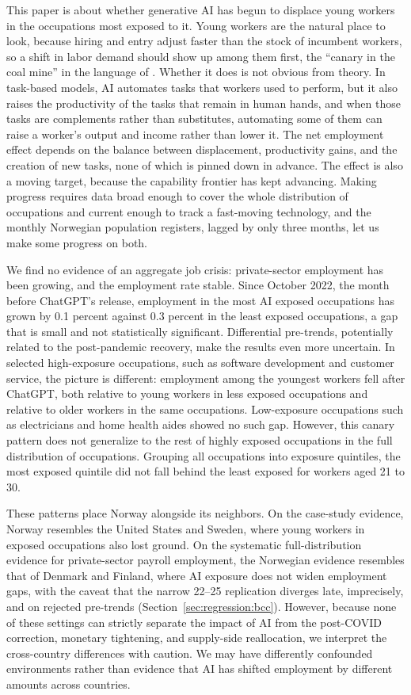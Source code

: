 \documentclass[12pt]{article}
\begin{document}
This paper is about whether generative AI has begun to displace young workers in the occupations most exposed to it. Young workers are the natural place to look, because hiring and entry adjust faster than the stock of incumbent workers, so a shift in labor demand should show up among them first, the ``canary in the coal mine'' in the language of \citet{brynjolfsson2025}. Whether it does is not obvious from theory. In task-based models, AI automates tasks that workers used to perform, but it also raises the productivity of the tasks that remain in human hands, and when those tasks are complements rather than substitutes, automating some of them can raise a worker's output and income rather than lower it. The net employment effect depends on the balance between displacement, productivity gains, and the creation of new tasks, none of which is pinned down in advance. The effect is also a moving target, because the capability frontier has kept advancing. Making progress requires data broad enough to cover the whole distribution of occupations and current enough to track a fast-moving technology, and the monthly Norwegian population registers, lagged by only three months, let us make some progress on both.

We find no evidence of an aggregate job crisis: private-sector employment has been growing, and the employment rate stable. Since October 2022, the month before ChatGPT's release, employment in the most AI exposed occupations has grown by 0.1 percent against 0.3 percent in the least exposed occupations, a gap that is small and not statistically significant. Differential pre-trends, potentially related to the post-pandemic recovery, make the results even more uncertain. In selected high-exposure occupations, such as software development and customer service, the picture is different: employment among the youngest workers fell after ChatGPT, both relative to young workers in less exposed occupations and relative to older workers in the same occupations. Low-exposure occupations such as electricians and home health aides showed no such gap. However, this canary pattern does not generalize to the rest of highly exposed occupations in the full distribution of occupations. Grouping all occupations into exposure quintiles, the most exposed quintile did not fall behind the least exposed for workers aged 21 to 30.

These patterns place Norway alongside its neighbors. On the case-study evidence, Norway resembles the United States and Sweden, where young workers in exposed occupations also lost ground. On the systematic full-distribution evidence for private-sector payroll employment, the Norwegian evidence resembles that of Denmark and Finland, where AI exposure does not widen employment gaps, with the caveat that the narrow 22--25 replication diverges late, imprecisely, and on rejected pre-trends (Section~\ref{sec:regression:bcc}). However, because none of these settings can strictly separate the impact of AI from the post-COVID correction, monetary tightening, and supply-side reallocation, we interpret the cross-country differences with caution. We may have differently confounded environments rather than evidence that AI has shifted employment by different amounts across countries. 
\end{document}
